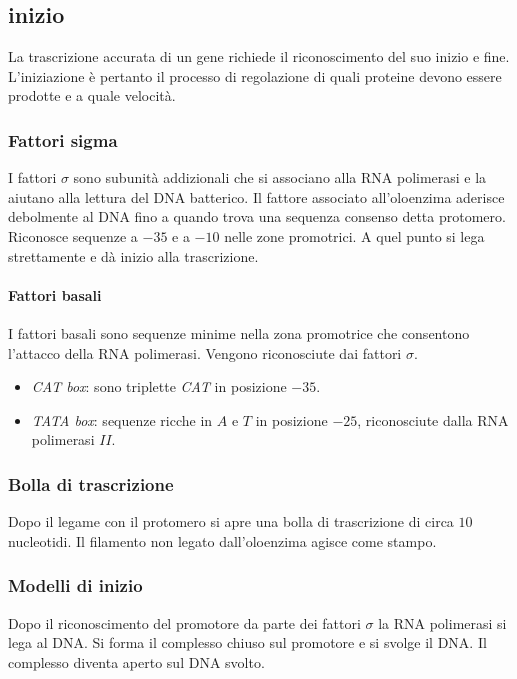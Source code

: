 	\subsection{inizio}
	La trascrizione accurata di un gene richiede il riconoscimento del suo inizio e fine.
	L'iniziazione \`e pertanto il processo di regolazione di quali proteine devono essere prodotte e a quale velocit\`a.

		\subsubsection{Fattori sigma}
		I fattori $\sigma$ sono subunit\`a addizionali che si associano alla RNA polimerasi e la aiutano alla lettura del DNA batterico.
		Il fattore associato all'oloenzima aderisce debolmente al DNA fino a quando trova una sequenza consenso detta protomero.
		Riconosce sequenze a $-35$ e a $-10$ nelle zone promotrici.
		A quel punto si lega strettamente e d\`a inizio alla trascrizione.
		
			\paragraph{Fattori basali}
			I fattori basali sono sequenze minime nella zona promotrice che consentono l'attacco della RNA polimerasi.
			Vengono riconosciute dai fattori $\sigma$.
			\begin{multicols}{2}
				\begin{itemize}
					\item \emph{CAT box}: sono triplette \emph{CAT} in posizione $-35$.
					\item \emph{TATA box}: sequenze ricche in $A$ e $T$ in posizione $-25$, riconosciute dalla RNA polimerasi $II$.
				\end{itemize}
			\end{multicols}



		\subsubsection{Bolla di trascrizione}
		Dopo il legame con il protomero si apre una bolla di trascrizione di circa $10$ nucleotidi.
		Il filamento non legato dall'oloenzima agisce come stampo.

		\subsubsection{Modelli di inizio}
		Dopo il riconoscimento del promotore da parte dei fattori $\sigma$ la RNA polimerasi si lega al DNA.
		Si forma il complesso chiuso sul promotore e si svolge il DNA.
		Il complesso diventa aperto sul DNA svolto.

